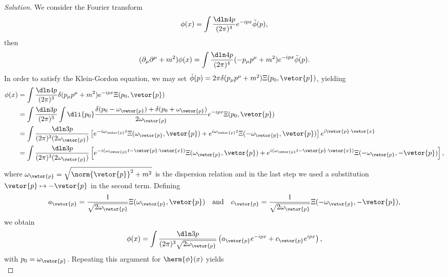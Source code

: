 \begin{proof}[Solution]
   We consider the Fourier transform
   \begin{equation*}
      \phi(x) = \int \frac{\dln4p}{(2\pi)^4} e^{-ipx}\tilde{\phi}(p),
   \end{equation*}
   then
   \begin{equation*}
      (\partial_\mu \partial^\mu + m^2)\phi(x) = \int\frac{\dln4p}{(2\pi)^4} (-p_\mu p^\mu + m^2) e^{-ipx} \tilde{\phi}(p).
   \end{equation*}
   In order to satisfy the Klein-Gordon equation, we may set \(\tilde{\phi}(p) = 2\pi \delta(p_\mu p^\mu + m^2) \Xi(p_0, \vetor{p})\), yielding
   \begin{align*}
      \phi(x) &= \int \frac{\dln4p}{(2\pi)^3} \delta(p_\mu p^\mu + m^2) e^{-ipx} \Xi(p_0, \vetor{p})\\
              &= \int \frac{\dln3p}{(2\pi)^3} \int \dli{p_0}\frac{\delta(p_0 - \omega_{\vetor{p}}) + \delta(p_0 + \omega_{\vetor{p}})}{2 \omega_{\vetor{p}}} e^{-ipx} \Xi(p_0, \vetor{p})\\
              &= \int \frac{\dln3p}{(2\pi)^3(2 \omega_{\vetor{p}})} \left[e^{-i\omega_{\vetor{p}} t} \Xi(\omega_{\vetor{p}}, \vetor{p}) + e^{i \omega_{\vetor{p}} t} \Xi(-\omega_{\vetor{p}}, \vetor{p})\right]e^{i \vetor{p} \cdot \vetor{x}}\\
              &= \int \frac{\dln3p}{(2\pi)^3(2\omega_{\vetor{p}})} \left[e^{-i(\omega_{\vetor{p}} t - \vetor{p}\cdot \vetor{x})} \Xi(\omega_{\vetor{p}}, \vetor{p}) + e^{i(\omega_{\vetor{p}} t - \vetor{p}\cdot\vetor{x})} \Xi(- \omega_{\vetor{p}}, -\vetor{p})\right],
   \end{align*}
   where \(\omega_{\vetor{p}} = \sqrt{\norm{\vetor{p}}^2 + m^2}\) is the dispersion relation and in the last step we used a substitution \(\vetor{p} \mapsto - \vetor{p}\) in the second term. Defining
   \begin{equation*}
      a_{\vetor{p}} = \frac{1}{\sqrt{2 \omega_{\vetor{p}}}}\Xi(\omega_{\vetor{p}}, \vetor{p})
      \quad\text{and}\quad
      c_{\vetor{p}} = \frac{1}{\sqrt{2 \omega_{\vetor{p}}}}\Xi(-\omega_{\vetor{p}}, -\vetor{p}),
   \end{equation*}
   we obtain
   \begin{equation*}
      \phi(x) = \int \frac{\dln3p}{(2\pi)^3 \sqrt{2\omega_{\vetor{p}}}} \left(a_{\vetor{p}} e^{-ipx} + c_{\vetor{p}} e^{ipx}\right),
   \end{equation*}
   with \(p_0 = \omega_{\vetor{p}}\). Repeating this argument for \(\herm{\phi}(x)\) yields
   \begin{equation*}

\end{equation*}
\end{proof}
